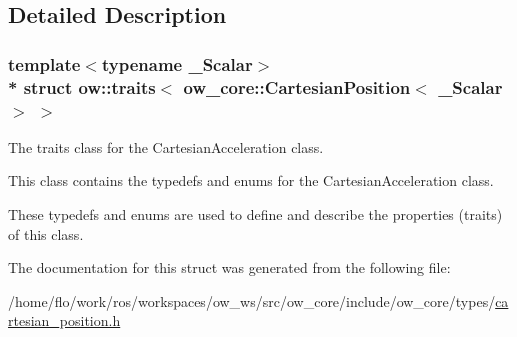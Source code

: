 \subsection{Detailed Description}
\subsubsection*{template$<$typename \+\_\+\+Scalar$>$\\*
struct ow\+::traits$<$ ow\+\_\+core\+::\+Cartesian\+Position$<$ \+\_\+\+Scalar $>$ $>$}

The traits class for the Cartesian\+Acceleration class. 

This class contains the typedefs and enums for the Cartesian\+Acceleration class.

These typedefs and enums are used to define and describe the properties (traits) of this class. 

The documentation for this struct was generated from the following file\+:\begin{DoxyCompactItemize}
\item 
/home/flo/work/ros/workspaces/ow\+\_\+ws/src/ow\+\_\+core/include/ow\+\_\+core/types/\hyperlink{cartesian__position_8h}{cartesian\+\_\+position.\+h}\end{DoxyCompactItemize}

